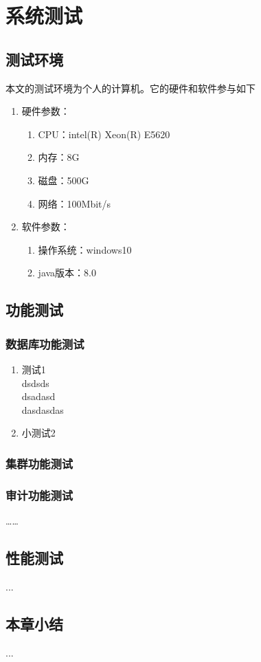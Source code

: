 
\chapter{系统测试}
\section{测试环境}
本文的测试环境为个人的计算机。它的硬件和软件参与如下
\begin{enumerate}
	\item 硬件参数：
	\begin{enumerate}
		\item CPU：intel(R) Xeon(R) E5620
		\item 内存：8G
		\item 磁盘：500G
		\item 网络：100Mbit/s
	\end{enumerate}
\item 软件参数：
\begin{enumerate}
	\item 操作系统：windows10
	\item java版本：8.0
\end{enumerate}
\end{enumerate}
\section{功能测试}
\subsection{数据库功能测试}
\begin{enumerate}
	\item 测试1\\
	dsdsds\\
	dsadasd\\
	dasdasdas
	\item 小测试2
\end{enumerate}
\subsection{集群功能测试}
\subsection{审计功能测试}
……
\section{性能测试}
...
\section{本章小结}
...